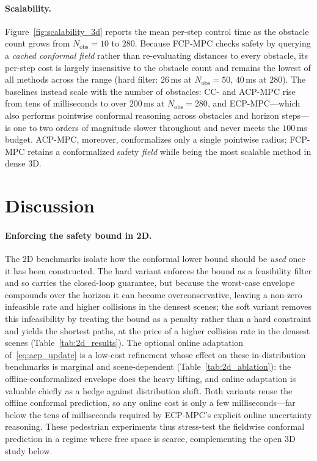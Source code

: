 \documentclass[lettersize,journal]{IEEEtran}
\begin{document}
\paragraph{Scalability.}
Figure~\ref{fig:scalability_3d} reports the mean per-step control time as the obstacle
count grows from $N_{\mathrm{obs}}=10$ to $280$.
Because FCP-MPC checks safety by querying a \emph{cached conformal field} rather than
re-evaluating distances to every obstacle, its per-step cost is largely insensitive to
the obstacle count and remains the lowest of all methods across the range (hard filter:
$26$\,ms at $N_{\mathrm{obs}}=50$, $40$\,ms at $280$).
The baselines instead scale with the number of obstacles: CC- and ACP-MPC rise from tens
of milliseconds to over $200$\,ms at $N_{\mathrm{obs}}=280$, and ECP-MPC---which also
performs pointwise conformal reasoning across obstacles and horizon steps---is one to two
orders of magnitude slower throughout and never meets the $100$\,ms budget.
ACP-MPC, moreover, conformalizes only a single pointwise radius; FCP-MPC retains a
conformalized safety \emph{field} while being the most scalable method in dense 3D.





\section{Discussion}
\label{sec:discussion}
\paragraph{Enforcing the safety bound in 2D.}
The 2D benchmarks isolate how the conformal lower bound should be \emph{used}
once it has been constructed.
The hard variant enforces the bound as a feasibility filter and so carries the
closed-loop guarantee, but because the worst-case envelope compounds over the horizon
it can become overconservative, leaving a non-zero infeasible rate and higher collisions
in the densest scenes; the soft variant removes this infeasibility by treating the bound
as a penalty rather than a hard constraint and yields the shortest paths, at the price of
a higher collision rate in the densest scenes (Table~\ref{tab:2d_results}).
The optional online adaptation of~\eqref{eq:acp_update} is a low-cost refinement whose
effect on these in-distribution benchmarks is marginal and scene-dependent
(Table~\ref{tab:2d_ablation}): the offline-conformalized envelope does the heavy lifting,
and online adaptation is valuable chiefly as a hedge against distribution shift.
Both variants reuse the offline conformal prediction, so any online cost is only a few
milliseconds---far below the tens of milliseconds required by ECP-MPC's explicit
online uncertainty reasoning.
These pedestrian experiments thus stress-test the fieldwise conformal prediction in a regime
where free space is scarce, complementing the open 3D study below.
\end{document}
